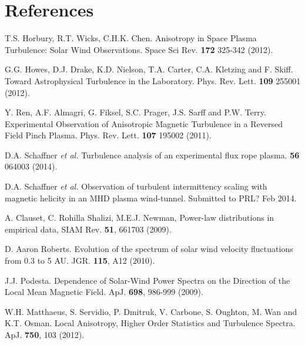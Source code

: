 \documentclass[aip,prl,amsmath,amssymb,reprint,superscriptaddress]{revtex4-1} %
\begin{document}
\section*{References}
\begin{thebibliography}{99}

 T.S. Horbury, R.T. Wicks, C.H.K. Chen. Anisotropy in Space Plasma Turbulence: Solar Wind Observations. Space Sci Rev. {\bf 172} 325-342 (2012).

 G.G. Howes, D.J. Drake, K.D. Nielson, T.A. Carter, C.A. Kletzing and F. Skiff. Toward Astrophysical Turbulence in the Laboratory. Phys. Rev. Lett. {\bf 109} 255001 (2012).

 Y. Ren, A.F. Almagri, G. Fiksel, S.C. Prager, J.S. Sarff and P.W. Terry. Experimental Observation of Anisotropic Magnetic Turbulence in a Reversed Field Pinch Plasma. Phys. Rev. Lett. {\bf 107} 195002 (2011).

 D.A. Schaffner {\it et al.} Turbulence analysis of an experimental flux rope plasma. {\bf 56} 064003 (2014).

 D.A. Schaffner {\it et al.} Observation of turbulent intermittency scaling with magnetic helicity in an MHD plasma wind-tunnel. Submitted to PRL? Feb 2014.

A. Clauset, C. Rohilla Shalizi, M.E.J. Newman, Power-law distributions in empirical data, SIAM Rev. {\bf 51}, 661703 (2009).

D. Aaron Roberts. Evolution of the spectrum of solar wind velocity fluctuations from 0.3 to 5 AU. JGR. {\bf 115}, A12 (2010).

J.J. Podesta. Dependence of Solar-Wind Power Spectra on the Direction of the Local Mean Magnetic Field. ApJ. {\bf 698}, 986-999 (2009).

W.H. Matthaeus, S. Servidio, P. Dmitruk, V. Carbone, S. Oughton, M. Wan and K.T. Osman. Local Anisotropy, Higher Order Statistics and Turbulence Spectra. ApJ. {\bf 750}, 103 (2012).




\end{thebibliography}
\end{document}
